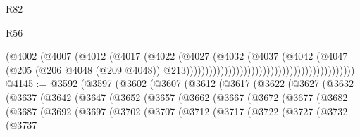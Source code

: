 \begin{lexlean}{R82}
\begin{lexlean}{R56}
\begin{coremodule}
{{{{{{{{{{{{{{{{{{{{{{{{{{{{{{{{{{{{{{{{{{{{{{{{{{{{{{{{{{{{{{{{{{{{{{{{{{{{{{{{{{{{{{{{{{{{{{{{{{{{{{{{{{{{{{{{{{{{{{{{{{{{{{{{{{{{{{{{{{{{{{{{{{{{{{{{{{{{{{{{{{{{{{{{{{{{{{{{{{{{{{{{{{{{{{{{{{{{{{{{{{{{{{{{{{{                                                                      (@4002
                                                                        (@4007
                                                                          (@4012
                                                                            (@4017
                                                                              (@4022
                                                                                (@4027
                                                                                  (@4032
                                                                                    (@4037
                                                                                      (@4042
                                                                                        (@4047
                                                                                          (@205
                                                                                            (@206
                                                                                              @4048
                                                                                              (@209
                                                                                                @4048))
                                                                                            @213))))))))))))))))))))))))))))))))))))))))))))
@4145 := @3592
    (@3597
      (@3602
        (@3607
          (@3612
            (@3617
              (@3622
                (@3627
                  (@3632
                    (@3637
                      (@3642
                        (@3647
                          (@3652
                            (@3657
                              (@3662
                                (@3667
                                  (@3672
                                    (@3677
                                      (@3682
                                        (@3687
                                          (@3692
                                            (@3697
                                              (@3702
                                                (@3707
                                                  (@3712
                                                    (@3717
                                                      (@3722
                                                        (@3727
                                                          (@3732
                                                            (@3737
}}}}}}}}}}}}}}}}}}}}}}}}}}}}}}}}}}}}}}}}}}}}}}}}}}}}}}}}}}}}}}}}}}}}}}}}}}}}}}}}}}}}}}}}}}}}}}}}}}}}}}}}}}}}}}}}}}}}}}}}}}}}}}}}}}}}}}}}}}}}}}}}}}}}}}}}}}}}}}}}}}}}}}}}}}}}}}}}}}}}}}}}}}}}}}}}}}}}}}}}}}}}}}}}}}}
\end{coremodule}
\end{lexlean}
\end{lexlean}
